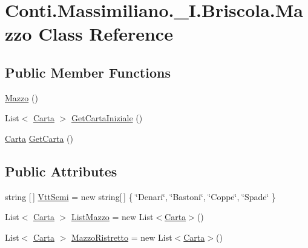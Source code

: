 \hypertarget{class_conti_1_1_massimiliano_1_1__5_i_1_1_briscola_1_1_mazzo}{}\section{Conti.\+Massimiliano.\+\_\+I.\+Briscola.\+Mazzo Class Reference}
\label{class_conti_1_1_massimiliano_1_1__5_i_1_1_briscola_1_1_mazzo}
\subsection*{Public Member Functions}
\begin{DoxyCompactItemize}
\item 
\hyperlink{class_conti_1_1_massimiliano_1_1__5_i_1_1_briscola_1_1_mazzo_a14ec4b325dde5c862a8445d9b92a46e4}{Mazzo} ()
\item 
List$<$ \hyperlink{class_conti_1_1_massimiliano_1_1__5_i_1_1_briscola_1_1_carta}{Carta} $>$ \hyperlink{class_conti_1_1_massimiliano_1_1__5_i_1_1_briscola_1_1_mazzo_ab25d55a44d733891ccb9c9a899fd38f3}{Get\+Carta\+Iniziale} ()
\item 
\hyperlink{class_conti_1_1_massimiliano_1_1__5_i_1_1_briscola_1_1_carta}{Carta} \hyperlink{class_conti_1_1_massimiliano_1_1__5_i_1_1_briscola_1_1_mazzo_ae4ea7e6f677aff31ff2bf322f6054083}{Get\+Carta} ()
\end{DoxyCompactItemize}
\subsection*{Public Attributes}
\begin{DoxyCompactItemize}
\item 
string \mbox{[}$\,$\mbox{]} \hyperlink{class_conti_1_1_massimiliano_1_1__5_i_1_1_briscola_1_1_mazzo_a25dba987afb4a0ce852feb8a32cf3db4}{Vtt\+Semi} = new string\mbox{[}$\,$\mbox{]} \{ \char`\"{}Denari\char`\"{}, \char`\"{}Bastoni\char`\"{}, \char`\"{}Coppe\char`\"{}, \char`\"{}Spade\char`\"{} \}
\item 
List$<$ \hyperlink{class_conti_1_1_massimiliano_1_1__5_i_1_1_briscola_1_1_carta}{Carta} $>$ \hyperlink{class_conti_1_1_massimiliano_1_1__5_i_1_1_briscola_1_1_mazzo_a93b3bb3e4836036324625d2db7208e9b}{List\+Mazzo} = new List$<$\hyperlink{class_conti_1_1_massimiliano_1_1__5_i_1_1_briscola_1_1_carta}{Carta}$>$()
\item 
List$<$ \hyperlink{class_conti_1_1_massimiliano_1_1__5_i_1_1_briscola_1_1_carta}{Carta} $>$ \hyperlink{class_conti_1_1_massimiliano_1_1__5_i_1_1_briscola_1_1_mazzo_a13c61be3aaa21495e679fe83a393b128}{Mazzo\+Ristretto} = new List$<$\hyperlink{class_conti_1_1_massimiliano_1_1__5_i_1_1_briscola_1_1_carta}{Carta}$>$()
\end{DoxyCompactItemize}
